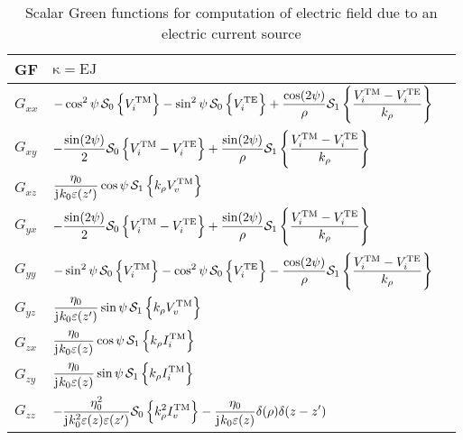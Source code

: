 \documentclass[12pt]{article}
\begin{document}
\begin{table}[!ht]
  \begin{center}
    \begin{tabular}{| C{1cm} | C{12cm} |  @{}m{0pt}@{}}
      \hline
      GF & $\mathrm{\kappa} = \mathrm{EJ}$ &\\ [1.5ex]
      \hline\hline
      $G_{xx}$ & $ \displaystyle - \cos^2 \psi \, \mathcal{S}_0 \left \{ V_i^\mathrm{TM} \right \} - \sin^2 \psi \, \mathcal{S}_0 \left \{ V_i^\mathrm{TE} \right \} + \frac{ \cos (2 \psi)}{\rho} \mathcal{S}_1 \left \{ \frac{V_i^\mathrm{TM} - V_i^\mathrm{TE}}{k_{\rho}} \right \}$ &\\ [3.5ex]
      $G_{xy}$ & $ \displaystyle - \frac{\sin (2 \psi)}{2} \mathcal{S}_0 \left \{ {V_i^\mathrm{TM} - V_i^\mathrm{TE}} \right \} + \frac{\sin (2 \psi)}{\rho} \mathcal{S}_1 \left \{ \frac{V_i^\mathrm{TM} - V_i^\mathrm{TE}}{k_{\rho}} \right \}$ &\\ [3.5ex]
      $G_{xz}$ & $ \displaystyle \frac{\eta_0}{\mathrm{j}\mkern1mu k_0 \varepsilon(z')} \cos \psi \,  \mathcal{S}_1 \left \{ {k_{\rho} V_v^\mathrm{TM}} \right \}$ &\\ [3.5ex]
      $G_{yx}$ & $ \displaystyle - \frac{\sin (2 \psi)}{2} \mathcal{S}_0 \left \{ {V_i^\mathrm{TM} - V_i^\mathrm{TE}} \right \} + \frac{\sin (2 \psi)}{\rho} \mathcal{S}_1 \left \{ \frac{V_i^\mathrm{TM} - V_i^\mathrm{TE}}{k_{\rho}} \right \}$  &\\ [3.5ex]
      $G_{yy}$ & $ \displaystyle - \sin^2 \psi \, \mathcal{S}_0 \left \{ V_i^\mathrm{TM} \right \} - \cos^2 \psi \, \mathcal{S}_0 \left \{ V_i^\mathrm{TE} \right \} - \frac{ \cos (2 \psi)}{\rho} \mathcal{S}_1 \left \{ \frac{V_i^\mathrm{TM} - V_i^\mathrm{TE}}{k_{\rho}} \right \}$ &\\ [3.5ex]
      $G_{yz}$ & $\displaystyle \frac{\eta_0}{\mathrm{j}\mkern1mu k_0 \varepsilon(z')} \sin \psi \,  \mathcal{S}_1 \left \{ {k_{\rho} V_v^\mathrm{TM}} \right \}$  &\\ [3.5ex]
      $G_{zx}$ & $\displaystyle \frac{\eta_0}{\mathrm{j}\mkern1mu k_0 \varepsilon(z)} \cos \psi \,  \mathcal{S}_1 \left \{ {k_{\rho} I_i^\mathrm{TM}} \right \}$    &\\ [3.5ex]
      $G_{zy}$ & $\displaystyle \frac{\eta_0}{\mathrm{j}\mkern1mu k_0 \varepsilon(z)} \sin \psi \,  \mathcal{S}_1 \left \{ {k_{\rho} I_i^\mathrm{TM}} \right \}$   &\\ [3.5ex]
      $G_{zz}$ & $\displaystyle -\frac{\eta_0^2}{\mathrm{j}\mkern1mu k_0^2 \varepsilon(z) \varepsilon(z')} \mathcal{S}_0 \left \{ {k^2_{\rho} I_v^\mathrm{TM}} \right \} - \frac{\eta_0}{\mathrm{j}\mkern1mu k_0 \varepsilon(z)} \delta(\mathbf{\rho}) \delta(z -z')$  &\\ [3.5ex]
      \hline \hline
    \end{tabular}
  \end{center}
  \caption{Scalar Green functions for computation of electric field due to an electric current source \cite{Michalski2005}}
  \label{tab:EJ}
\end{table}
\end{document}
